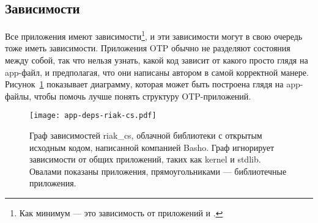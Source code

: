 \documentclass[11pt, oneside]{book}   	%
\begin{document}
\subsection{Зависимости}
\label{subsec:dive-dependencies}

Все приложения имеют зависимости\footnote{Как минимум --- это зависимость от приложений  и .}, и эти зависимости могут в свою очередь тоже иметь зависимости. Приложения OTP обычно не разделяют состояния между собой, так что нельзя узнать, какой код зависит от какого просто глядя на app-файл, и предполагая, что они написаны автором в самой корректной манере. Рисунок~\ref{fig:app-deps} показывает диаграмму, которая может быть построена глядя на app-файлы, чтобы помочь лучше понять структуру OTP-приложений.


\begin{figure}
  \texttt{[image: app-deps-riak-cs.pdf]}%
  \caption{Граф зависимостей riak\_cs, облачной библиотеки с открытым исходным кодом, написанной компанией Basho. Граф игнорирует зависимости от общих приложений, таких как kernel и stdlib. Овалами показаны приложения, прямоугольниками --- библиотечные приложения.}%
   \label{fig:app-deps}
\end{figure}
\end{document}
